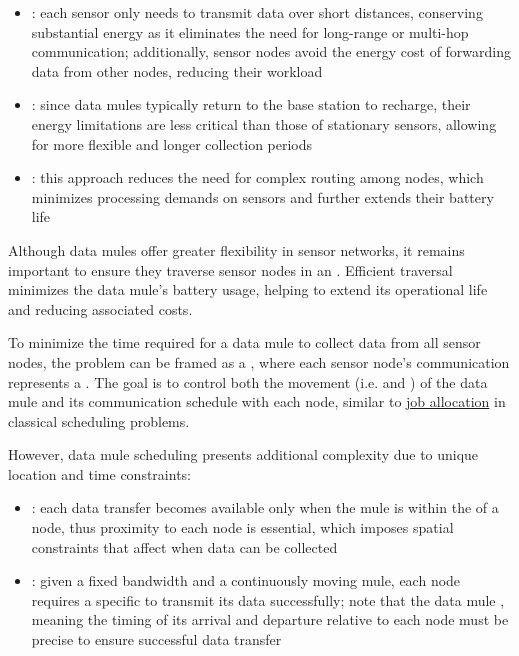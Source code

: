 \documentclass[a4paper, 12pt]{report}
\begin{document}
    \begin{itemize}
        \item {}: each sensor only needs to transmit data over short distances, conserving substantial energy as it eliminates the need for long-range or multi-hop communication; additionally, sensor nodes avoid the energy cost of forwarding data from other nodes, reducing their workload
        \item {}: since data mules typically return to the base station to recharge, their energy limitations are less critical than those of stationary sensors, allowing for more flexible and longer collection periods
        \item {}: this approach reduces the need for complex routing among nodes, which minimizes processing demands on sensors and further extends their battery life
    \end{itemize}

    Although data mules offer greater flexibility in sensor networks, it remains important to ensure they traverse sensor nodes in an . Efficient traversal minimizes the data mule's battery usage, helping to extend its operational life and reducing associated costs.

    To minimize the time required for a data mule to collect data from all sensor nodes, the problem can be framed as a , where each sensor node's communication represents a . The goal is to control both the movement (i.e.  and ) of the data mule and its communication schedule with each node, similar to \href{https://en.wikipedia.org/wiki/Optimal_job_scheduling}{job allocation} in classical scheduling problems.

    However, data mule scheduling presents additional complexity due to unique location and time constraints:

    \begin{itemize}
        \item {}: each data transfer becomes available only when the mule is within the  of a node, thus proximity to each node is essential, which imposes spatial constraints that affect when data can be collected
        \item {}: given a fixed bandwidth and a continuously moving mule, each node requires a specific  to transmit its data successfully; note that the data mule , meaning the timing of its arrival and departure relative to each node must be precise to ensure successful data transfer
    \end{itemize}
\end{document}
